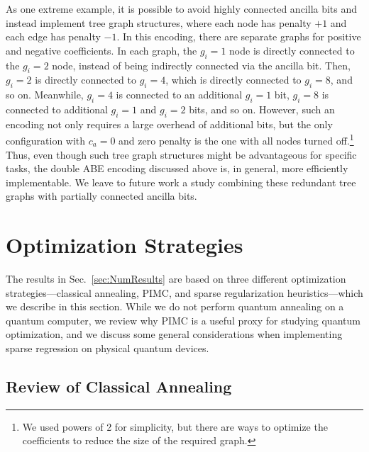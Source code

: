 \documentclass[aps,prd,twocolumn, superscriptaddress,preprintnumbers, nofootinbib,longbibliography,floatfix]{revtex4-2}
\DeclareRobustCommand{\Sec}[1]{Sec.~\ref{#1}}
\begin{document}
As one extreme example, it is possible to avoid highly connected ancilla bits and instead implement tree graph structures, where each node has penalty $+1$ and each edge has penalty $-1$.
%
In this encoding, there are separate graphs for positive and negative coefficients.
%
In each graph, the $g_i=1$ node is directly connected to the $g_i=2$ node, instead of being indirectly connected via the ancilla bit.
%
Then, $g_i=2$ is directly connected to $g_i=4$, which is directly connected to $g_i=8$, and so on.
%
Meanwhile, $g_i=4$ is connected to an additional $g_i=1$ bit, $g_i=8$ is connected to additional $g_i=1$ and $g_i=2$ bits, and so on.
%
However, such an encoding not only requires a large overhead of additional bits, but the only configuration with $c_a = 0$ and zero penalty is the one with all nodes turned off.\footnote{We used powers of 2 for simplicity, but there are ways to optimize the coefficients to reduce the size of the required graph.}
%
Thus, even though such tree graph structures might be advantageous for specific tasks, the double ABE encoding discussed above is, in general, more efficiently implementable.
%
We leave to future work a study combining these redundant tree graphs with partially connected ancilla bits.


\section{Optimization Strategies}
\label{sec:Opt}

The results in \Sec{sec:NumResults} are based on three different optimization strategies---classical annealing, PIMC, and sparse regularization heuristics---which we describe in this section.
%
While we do not perform quantum annealing on a quantum computer, we review why PIMC is a useful proxy for studying quantum optimization, and we discuss some general considerations when implementing sparse regression on physical quantum devices.


\subsection{Review of Classical Annealing} \label{sec:ReviewAnnealing}
\end{document}
